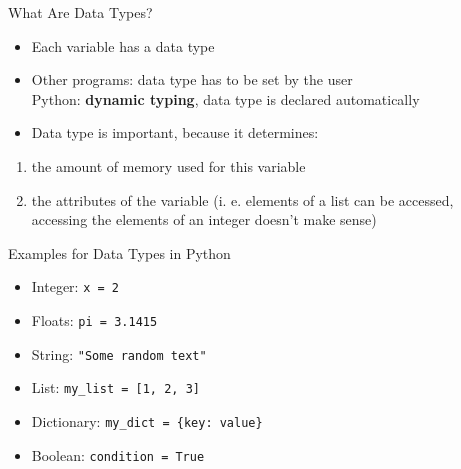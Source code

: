 \documentclass[
                en,
                ]{sdqbeamer}
\begin{document}
\begin{frame}{What Are Data Types?}
    \begin{itemize}
        \setlength\itemsep{2em}
        \item Each variable has a data type
        \item Other programs: data type has to be set by the user \\
            Python: \textbf{dynamic typing}, data type is declared automatically
        \item Data type is important, because it determines:
    \end{itemize}

    \vfill

    \begin{enumerate}
        \setlength\itemsep{1em}
        \item the amount of memory used for this variable
        \item the attributes of the variable (i. e. elements of a list
            can be accessed, accessing the elements of an integer
            doesn't make sense)
    \end{enumerate}
    
\end{frame}

\begin{frame}{Examples for Data Types in Python}

    \begin{itemize}
        \setlength\itemsep{2em}
        \item Integer: \texttt{x = 2}
        \item Floats: \texttt{pi = 3.1415}
        \item String: \texttt{"Some random text"}
        \item List: \texttt{my\_list = [1, 2, 3]}
        \item Dictionary: \texttt{my\_dict = \{key: value\}}
        \item Boolean: \texttt{condition = True}
    \end{itemize}

\end{frame}
\end{document}

